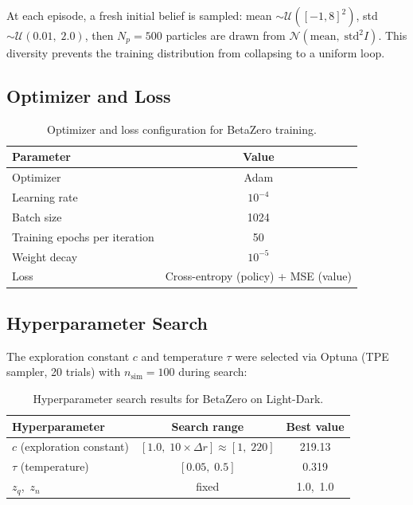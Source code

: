 \documentclass[acmlarge, manuscript, screen, review, natbib=false, oneside]{acmart}
\begin{document}
At each episode, a fresh initial belief is sampled: mean $\sim \mathcal{U}([-1,8]^2)$, std $\sim \mathcal{U}(0.01,\;2.0)$, then $N_p = 500$ particles are drawn from $\mathcal{N}(\text{mean},\;\text{std}^2 I)$. This diversity prevents the training distribution from collapsing to a uniform loop.

\subsection{Optimizer and Loss}

\begin{table}[ht]
    \centering
    \small
    \setlength{\tabcolsep}{4pt}
    \begin{tabular}{|l|c|}
        \hline
        \textbf{Parameter} & \textbf{Value} \\
        \hline
        Optimizer & Adam \\
        \hline
        Learning rate & $10^{-4}$ \\
        \hline
        Batch size & 1024 \\
        \hline
        Training epochs per iteration & 50 \\
        \hline
        Weight decay & $10^{-5}$ \\
        \hline
        Loss & Cross-entropy (policy) + MSE (value) \\
        \hline
    \end{tabular}
    \caption{Optimizer and loss configuration for BetaZero training.}
    \label{tab:bz_optimizer}
\end{table}

\subsection{Hyperparameter Search}

The exploration constant $c$ and temperature $\tau$ were selected via Optuna (TPE sampler, 20 trials) with $n_\text{sim}=100$ during search:

\begin{table}[ht]
    \centering
    \small
    \setlength{\tabcolsep}{4pt}
    \begin{tabular}{|l|c|c|}
        \hline
        \textbf{Hyperparameter} & \textbf{Search range} & \textbf{Best value} \\
        \hline
        $c$ (exploration constant) & $[1.0,\;10\times\Delta r] \approx [1,\;220]$ & 219.13 \\
        \hline
        $\tau$ (temperature) & $[0.05,\;0.5]$ & 0.319 \\
        \hline
        $z_q$,\ $z_n$ & fixed & 1.0,\ 1.0 \\
        \hline
    \end{tabular}
    \caption{Hyperparameter search results for BetaZero on Light-Dark.}
    \label{tab:bz_hparam}
\end{table}
\end{document}
